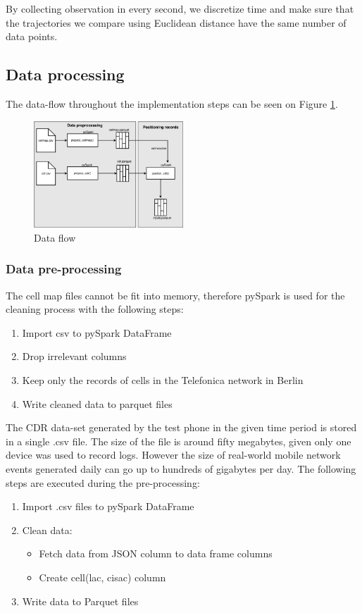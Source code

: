 By collecting observation in every second, we discretize time and make sure that the trajectories we compare using Euclidean distance have the same number of data points.

\subsection{Data processing}\label{sec:data-proc}
The data-flow throughout the implementation steps can be seen on Figure \ref{fig:data-flow}.
\begin{figure}[h]
    \centering
    \includegraphics[width=0.5\textwidth]{images/data-flow.png}
    \caption{Data flow}
    \label{fig:data-flow}
\end{figure}

\subsubsection{Data pre-processing}
The cell map files cannot be fit into memory, therefore pySpark is used for the cleaning process with the following steps: 
\begin{enumerate}
    \item Import csv to pySpark DataFrame
    \item Drop irrelevant columns
    \item Keep only the records of cells in the Telefonica network in Berlin
    \item Write cleaned data to parquet files
\end{enumerate}

The CDR data-set generated by the test phone in the given time period is stored in a single .csv file. The size of the file is around fifty megabytes, given only one device was used to record logs. However the size of real-world mobile network events generated daily can go up to hundreds of gigabytes per day. The following steps are executed during the pre-processing: 
\begin{enumerate}
   \item Import .csv files to pySpark DataFrame
    \item Clean data:
    \begin{itemize}
        \item Fetch data from JSON column to data frame columns
        \item Create cell(lac, cisac) column
    \end{itemize}
    \item Write data to Parquet files
\end{enumerate}

